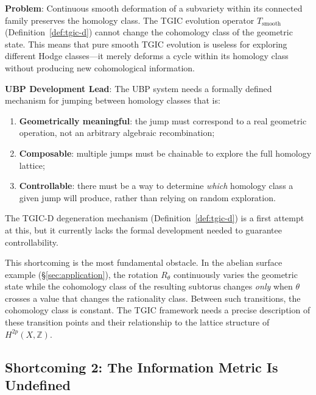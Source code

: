 \documentclass[11pt,a4paper]{article}
\theoremstyle{definition}
\theoremstyle{plain}
\newcommand{\ZZ}{\mathbb{Z}}
\begin{document}
\begin{tcolorbox}[colback=red!5, colframe=red!40!black, title={\textbf{Shortcoming 1: The Homology Lock}}]
\textbf{Problem}: Continuous smooth deformation of a subvariety within its connected family preserves the homology class. The TGIC evolution operator $T_{\mathrm{smooth}}$ (Definition~\ref{def:tgic-d}) cannot change the cohomology class of the geometric state. This means that pure smooth TGIC evolution is useless for exploring different Hodge classes---it merely deforms a cycle within its homology class without producing new cohomological information.

\medskip
\textbf{UBP Development Lead}: The UBP system needs a formally defined mechanism for jumping between homology classes that is:
\begin{enumerate}[nosep]
\item \textbf{Geometrically meaningful}: the jump must correspond to a real geometric operation, not an arbitrary algebraic recombination;
\item \textbf{Composable}: multiple jumps must be chainable to explore the full homology lattice;
\item \textbf{Controllable}: there must be a way to determine \emph{which} homology class a given jump will produce, rather than relying on random exploration.
\end{enumerate}
The TGIC-D degeneration mechanism (Definition~\ref{def:tgic-d}) is a first attempt at this, but it currently lacks the formal development needed to guarantee controllability.
\end{tcolorbox}

This shortcoming is the most fundamental obstacle. In the abelian surface example (\S\ref{sec:application}), the rotation $R_\theta$ continuously varies the geometric state while the cohomology class of the resulting subtorus changes \emph{only} when $\theta$ crosses a value that changes the rationality class. Between such transitions, the cohomology class is constant. The TGIC framework needs a precise description of these transition points and their relationship to the lattice structure of $H^{2p}(X, \ZZ)$.

\subsection{Shortcoming 2: The Information Metric Is Undefined}\label{sec:sc2}
\end{document}
